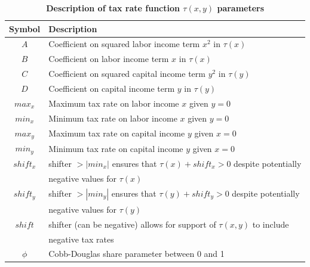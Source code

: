   \begin{table}[htbp] \centering \captionsetup{width=5.0in}
  \caption{\label{TabTaxCalcTfuncParams}\textbf{Description of tax rate function $\tau(x,y)$ parameters}}
    \begin{threeparttable}
    \begin{tabular}{>{\footnotesize}c |>{\footnotesize}l }
      \hline\hline
      Symbol & \quad\quad\quad\quad Description  \\
      \hline
      $A$ & Coefficient on squared labor income term $x^2$ in $\tau(x)$ \\
      $B$ & Coefficient on labor income term $x$ in $\tau(x)$ \\
      $C$ & Coefficient on squared capital income term $y^2$ in $\tau(y)$ \\
      $D$ & Coefficient on capital income term $y$ in $\tau(y)$ \\
      $max_x$ & Maximum tax rate on labor income $x$ given $y=0$  \\
      $min_x$ & Minimum tax rate on labor income $x$ given $y=0$ \\
      $max_y$ & Maximum tax rate on capital income $y$ given $x=0$ \\
      $min_y$ & Minimum tax rate on capital income $y$ given $x=0$ \\
      $shift_x$ & shifter $>|min_x|$ ensures that $\tau(x) + shift_x > 0$ despite potentially \\
      & \quad negative values for $\tau(x)$ \\
      $shift_y$ & shifter $>|min_y|$ ensures that $\tau(y) + shift_y > 0$  despite potentially \\
      & \quad negative values for $\tau(y)$ \\
      $shift$ & shifter (can be negative) allows for support of $\tau(x,y)$ to include \\
      & \quad negative tax rates \\
      $\phi$ & Cobb-Douglas share parameter between 0 and 1 \\
      \hline\hline
    \end{tabular}
    \end{threeparttable}
  \end{table}


